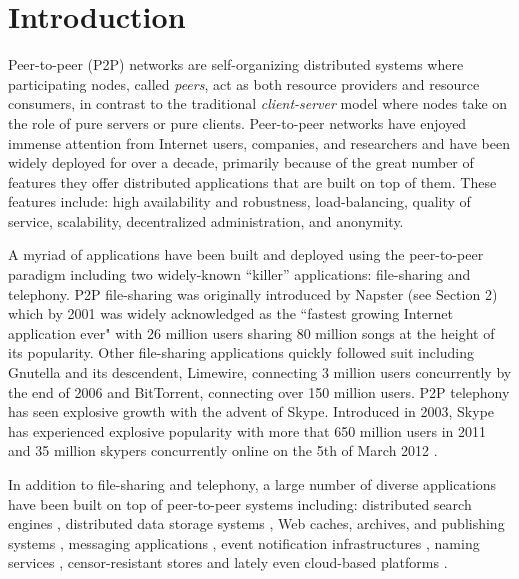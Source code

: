 \section{Introduction}
\label{section:intro}

Peer-to-peer (P2P) networks are self-organizing distributed systems
where participating nodes, called \emph{peers}, act as both resource
providers and resource consumers, in contrast to the traditional \emph{client-server}
model where nodes take on the role of pure servers or pure clients.  
Peer-to-peer networks have enjoyed immense attention from Internet users,
companies, and researchers and have been widely
deployed for over a decade, primarily because of the great
number of features they offer distributed applications that are built
on top of them.  These features include:  high availability and robustness,
load-balancing, quality of service, scalability, decentralized
administration, and anonymity.  

A myriad of applications have been built and deployed using the peer-to-peer
paradigm including two widely-known ``killer'' applications:  file-sharing and telephony.
P2P file-sharing was originally introduced by Napster (see Section 2)
which by 2001 was widely acknowledged as the ``fastest growing Internet application
ever" with 26 million users sharing 80 million songs at the height of its popularity.  
Other file-sharing applications
quickly followed suit including Gnutella and its descendent, Limewire, connecting
3 million users concurrently by the end of 2006 and BitTorrent, connecting
over 150 million users.
P2P telephony
has seen explosive growth with the advent of Skype.  Introduced in 2003, Skype
has experienced explosive popularity with 
more that 650 million users in 2011 \cite{skypetotalusers} and
35 million skypers concurrently online on
the 5th of March 2012 \cite{skypesymusers}.


In addition to file-sharing and telephony, a large number of diverse applications have
been built on top of peer-to-peer systems including:
distributed search engines \cite{yaci}, distributed data storage systems
\cite{kbc_oceanstore_2000,bdet_fsdfs_2000,dkkms_cfs_2001,dr_pastutility_2001,abc_farsite_2002,mmfc_ivy_2002,arla,agebh_dks_2003}, Web caches, archives,
and publishing systems \cite{ird_squirrel_2002,bags_youserv_2002,wrc_publius_2000,wm_tangler_2001},
messaging applications \cite{threedegrees}, event notification infrastructures
\cite{rkcd_scribe_2001,cdkr_scribe_2002,agebh_dks_2003}, naming services
\cite{cmm_chorddns_2002}, censor-resistant stores \cite{cswh_freenet_2001} and
lately even cloud-based platforms \cite{mgpj_cloudsnap_2011}.


